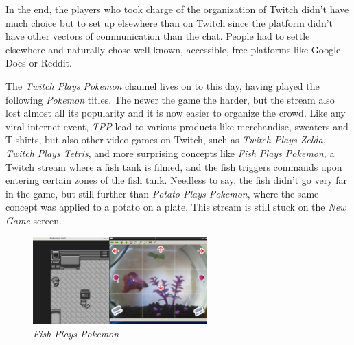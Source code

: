 \documentclass[a4paper]{article}
\begin{document}
In the end, the players who took charge of the organization of Twitch didn't have much choice but to set up elsewhere than on Twitch since the platform didn't have other vectors of communication than the chat. People had to settle elsewhere and naturally chose well-known, accessible, free platforms like Google Docs or Reddit.

The \textit{Twitch Plays Pokemon} channel lives on to this day, having played the following \textit{Pokemon} titles. The newer the game the harder, but the stream also lost almost all its popularity and it is now easier to organize the crowd. Like any viral internet event, \textit{TPP} lead to various products like merchandise, sweaters and T-shirts, but also other video games on Twitch, such as \textit{Twitch Plays Zelda}, \textit{Twitch Plays Tetris}, and more surprising concepts like \textit{Fish Plays Pokemon}, a Twitch stream where a fish tank is filmed, and the fish triggers commands upon entering certain zones of the fish tank. Needless to say, the fish didn't go very far in the game, but still further than \textit{Potato Plays Pokemon}, where the same concept was applied to a potato on a plate. This stream is still stuck on the \textit{New Game} screen.

\begin{figure}[h]
\includegraphics[width=0.6\textwidth,center]{pictures/FishPP.jpg}
\caption{\textit{Fish Plays Pokemon}}
\end{figure}
\end{document}
